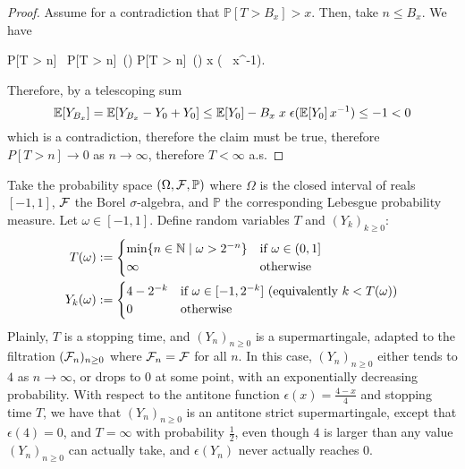 \begin{proof}
Assume for a contradiction that $\mathbb P[T > B_x] > x$.
Then, take $n \leq B_x$. 
We have
\begin{calculation}
\mathbb P[T > n]\ 
\mathbb P[T > n]\ \epsilon()
\mathbb P[T > n]\ \epsilon\Big(\Big)
x \; \epsilon\big( \, x^{-1}\big).
\end{calculation}
Therefore, by a telescoping sum
\[
\mathbb{E}[Y_{B_x}] 
= \mathbb{E}[Y_{B_x}-Y_0+Y_0] \leq \mathbb{E}[Y_0] - B_x \; x \; \epsilon(\mathbb{E}[Y_0] \, x^{-1})
\leq -1 < 0 
\]
which is a contradiction, therefore the claim must be true, therefore $P[T > n] \to 0$ as $n \to \infty$, therefore $T < \infty$ a.s.
\end{proof}
\begin{example}
Take the probability space $(\Omega, \mathcal{F}, \mathbb{P})$ where $\Omega$ is the closed interval of reals $[-1, 1]$, $\mathcal{F}$ the Borel $\sigma$-algebra, and $\mathbb{P}$ the corresponding Lebesgue probability measure.
Let $\omega \in [-1, 1]$. Define random variables $T$ and $(Y_k)_{k \geq 0}$:
\begin{align*}
T(\omega) & := 
\begin{cases}
\min\{n \in \mathbb{N} \mid \omega > 2^{-n}\} & \hbox{if $\omega \in (0, 1]$}\\
\infty & \hbox{otherwise}
\end{cases} 
\\
Y_k(\omega) & := 
\begin{cases}
4-2^{-k} & \hbox{if $\omega \in [-1, 2^{-k}]$ (equivalently $k < T(\omega)$)}\\
0 & \hbox{otherwise}
\end{cases} 
\end{align*}
Plainly, $T$ is a stopping time, and $(Y_n)_{n \geq 0}$ is a supermartingale, adapted to the filtration $(\mathcal{F}_n)_{n \geq 0}$ where $\mathcal{F}_n = \mathcal{F}$ for all $n$. 
In this case, $(Y_n)_{n \geq 0}$ either tends to $4$ as $n \to \infty$, or drops to 0 at some point, with an exponentially decreasing probability. 
With respect to the antitone function $\epsilon(x) = \frac{4-x}{4}$ and stopping time $T$, we have that $(Y_n)_{n \geq 0}$ is an antitone strict supermartingale, except that $\epsilon(4) = 0$, and $T = \infty$ with probability $\frac 1 2$, even though $4$ is larger than any value $(Y_n)_{n \geq 0}$ can actually take, and $\epsilon(Y_n)$ never actually reaches $0$.
\end{example}

